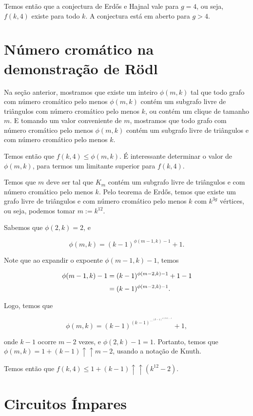 Temos então que a conjectura de Erd\H{o}s e Hajnal vale para $g=4$, ou seja, $f(k,4)$ existe para todo $k$. A conjectura está em aberto para $g > 4$.

\section{Número cromático na demonstração de R\"{o}dl}

Na seção anterior, mostramos que existe um inteiro $\phi(m,k)$ tal que todo grafo com número cromático pelo menos $\phi(m,k)$ contém um subgrafo livre de triângulos com número cromático pelo menos $k$, ou contém um clique de tamanho $m$. E tomando um valor conveniente de $m$, mostramos que todo grafo com número cromático pelo menos $\phi(m,k)$ contém um subgrafo livre de triângulos e com número cromático pelo menos $k$.

Temos então que $f(k,4) \leq \phi(m,k)$. É interessante determinar o valor de $\phi(m,k)$, para termos um limitante superior para $f(k,4)$.

Temos que $m$ deve ser tal que $K_m$ contém um subgrafo livre de triângulos e com número cromático pelo menos $k$. Pelo teorema de Erd\H{o}s, temos que existe um grafo livre de triângulos e com número cromático pelo menos $k$ com $k^{3g}$ vértices, ou seja, podemos tomar $m := k^{12}$.

Sabemos que $\phi(2,k) = 2$, e

\[\phi(m,k) = (k-1)^{\phi(m-1,k)-1}+1.\]

Note que ao expandir o expoente $\phi(m-1,k)-1$, temos

\begin{equation*}
\setlength{\jot}{5pt}
\begin{aligned}
\phi(m-1,k)-1 &= (k-1)^{\phi(m-2,k)-1}+1-1 \\
&= (k-1)^{\phi(m-2,k)-1}.
\end{aligned}
\end{equation*}

Logo, temos que 

\[\phi(m,k) = (k-1)^{(k-1)^{\cdots^{(k-1)^{\phi(2,k)-1}}}}+1,\]

onde $k-1$ ocorre $m-2$ vezes, e $\phi(2,k)-1 = 1$. Portanto, temos que $\phi(m,k) = 1+(k-1)\uparrow\uparrow m-2$, usando a notação de Knuth.

Temos então que $f(k,4) \leq 1+ (k-1) \uparrow\uparrow (k^{12}-2)$.

\section{Circuitos Ímpares}


